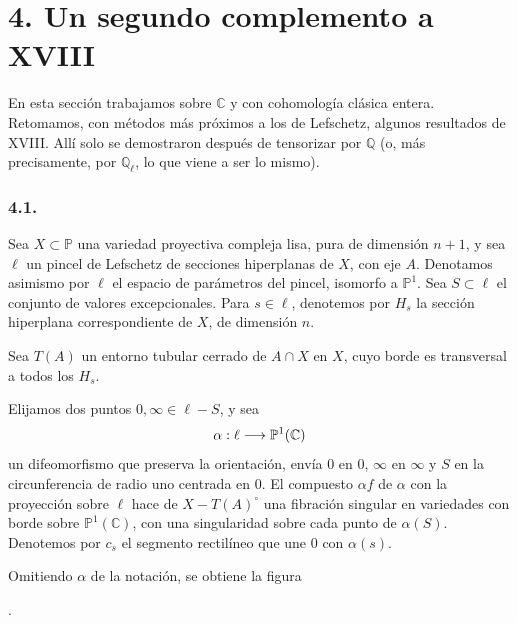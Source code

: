 \section*{4. Un segundo complemento a XVIII}

En esta sección trabajamos sobre $\mathbb C$ y con cohomología clásica
entera. Retomamos, con métodos más próximos a los de Lefschetz, algunos
resultados de XVIII. Allí solo se demostraron después de tensorizar por
$\mathbb Q$ (o, más precisamente, por $\mathbb Q_\ell$, lo que viene a
ser lo mismo).

\subsubsection*{4.1.}

Sea $X\subset\mathbb P$ una variedad proyectiva compleja lisa, pura de
dimensión $n+1$, y sea $\ell$ un pincel de Lefschetz de secciones
hiperplanas de $X$, con eje $A$. Denotamos asimismo por $\ell$ el
espacio de parámetros del pincel, isomorfo a $\mathbb P^1$. Sea
$S\subset\ell$ el conjunto de valores excepcionales. Para $s\in\ell$,
denotemos por $H_s$ la sección hiperplana correspondiente de $X$, de
dimensión $n$.

\pageoriginale

Sea $T(A)$ un entorno tubular cerrado de $A\cap X$ en $X$, cuyo borde
es transversal a todos los $H_s$.

Elijamos dos puntos $0,\infty\in\ell-S$, y sea
\[
\alpha:\sisi{\ell-S}{\ell}\longrightarrow\mathbb P^1(\mathbb C)
\]
un difeomorfismo que preserva la orientación, envía $0$ en $0$,
$\infty$ en $\infty$ y $S$ en la circunferencia de radio uno centrada
en $0$. El compuesto $\alpha f$ de $\alpha$ con la proyección sobre
$\ell$ hace de $X-T(A)^\circ$ una fibración singular en variedades con
borde sobre $\mathbb P^1(\mathbb C)$, con una singularidad sobre cada
punto de $\alpha(S)$. Denotemos por $c_s$ el segmento rectilíneo que une
$0$ con $\alpha(s)$.

Omitiendo $\alpha$ de la notación, se obtiene la figura
\begin{center}
.
\end{center}


